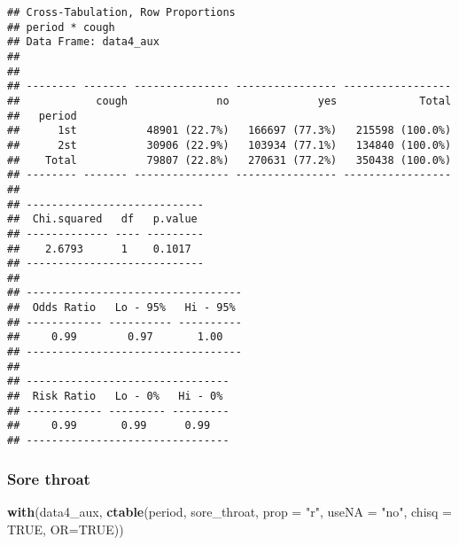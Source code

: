 \documentclass[
]{article}
\newenvironment{Shaded}{\begin{snugshade}}{\end{snugshade}}
\newcommand{\DataTypeTok}[1]{\textcolor[rgb]{0.13,0.29,0.53}{#1}}
\newcommand{\KeywordTok}[1]{\textcolor[rgb]{0.13,0.29,0.53}{\textbf{#1}}}
\newcommand{\NormalTok}[1]{#1}
\newcommand{\OtherTok}[1]{\textcolor[rgb]{0.56,0.35,0.01}{#1}}
\newcommand{\StringTok}[1]{\textcolor[rgb]{0.31,0.60,0.02}{#1}}
\begin{document}
\begin{verbatim}
## Cross-Tabulation, Row Proportions  
## period * cough  
## Data Frame: data4_aux  
## 
## 
## -------- ------- --------------- ---------------- -----------------
##            cough              no              yes             Total
##   period                                                           
##      1st           48901 (22.7%)   166697 (77.3%)   215598 (100.0%)
##      2st           30906 (22.9%)   103934 (77.1%)   134840 (100.0%)
##    Total           79807 (22.8%)   270631 (77.2%)   350438 (100.0%)
## -------- ------- --------------- ---------------- -----------------
## 
## ----------------------------
##  Chi.squared   df   p.value 
## ------------- ---- ---------
##    2.6793      1    0.1017  
## ----------------------------
## 
## ----------------------------------
##  Odds Ratio   Lo - 95%   Hi - 95% 
## ------------ ---------- ----------
##     0.99        0.97       1.00   
## ----------------------------------
## 
## --------------------------------
##  Risk Ratio   Lo - 0%   Hi - 0% 
## ------------ --------- ---------
##     0.99       0.99      0.99   
## --------------------------------
\end{verbatim}

\hypertarget{sore-throat}{%
\subsubsection{Sore throat}\label{sore-throat}}

\begin{Shaded}
\begin{Highlighting}[]
\KeywordTok{with}\NormalTok{(data4_aux, }\KeywordTok{ctable}\NormalTok{(period, sore_throat, }\DataTypeTok{prop =} \StringTok{"r"}\NormalTok{, }\DataTypeTok{useNA =} \StringTok{"no"}\NormalTok{, }\DataTypeTok{chisq =} \OtherTok{TRUE}\NormalTok{, }\DataTypeTok{OR=}\OtherTok{TRUE}\NormalTok{))}
\end{Highlighting}
\end{Shaded}
\end{document}
